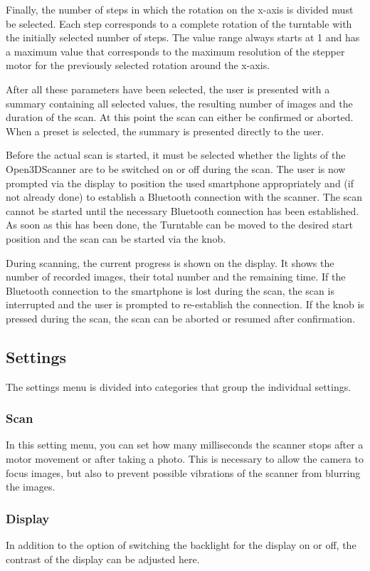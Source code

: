 Finally, the number of steps in which the rotation on the x-axis is divided must be selected. Each step corresponds to a complete rotation of the turntable with the initially selected number of steps. The value range always starts at 1 and has a maximum value that corresponds to the maximum resolution of the stepper motor for the previously selected rotation around the x-axis.%

After all these parameters have been selected, the user is presented with a summary containing all selected values, the resulting number of images and the duration of the scan. At this point the scan can either be confirmed or aborted. When a preset is selected, the summary is presented directly to the user.%

Before the actual scan is started, it must be selected whether the lights of the Open3DScanner are to be switched on or off during the scan. The user is now prompted via the display to position the used smartphone appropriately and (if not already done) to establish a Bluetooth connection with the scanner. The scan cannot be started until the necessary Bluetooth connection has been established. As soon as this has been done, the Turntable can be moved to the desired start position and the scan can be started via the knob.%

During scanning, the current progress is shown on the display. It shows the number of recorded images, their total number and the remaining time. If the Bluetooth connection to the smartphone is lost during the scan, the scan is interrupted and the user is prompted to re-establish the connection. If the knob is pressed during the scan, the scan can be aborted or resumed after confirmation.%

\subsection{Settings}%
The settings menu is divided into categories that group the individual settings.%

\subsubsection{Scan}%
In this setting menu, you can set how many milliseconds the scanner stops after a motor movement or after taking a photo. This is necessary to allow the camera to focus images, but also to prevent possible vibrations of the scanner from blurring the images.%

\subsubsection{Display}%
In addition to the option of switching the backlight for the display on or off, the contrast of the display can be adjusted here.%

